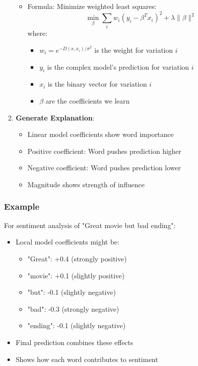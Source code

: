 \documentclass{article}
\begin{document}
\begin{enumerate}
\begin{itemize}
\begin{itemize}
                \end{itemize}
            \item Formula: Minimize weighted least squares:
                \begin{equation}
                    \min_{\beta} \sum_{i} w_i(y_i - \beta^T x_i)^2 + \lambda\|\beta\|^2
                \end{equation}
                where:
                \begin{itemize}
                    \item $w_i = e^{-D(x,x_i)/\sigma^2}$ is the weight for variation $i$
                    \item $y_i$ is the complex model's prediction for variation $i$
                    \item $x_i$ is the binary vector for variation $i$
                    \item $\beta$ are the coefficients we learn
                \end{itemize}
        \end{itemize}
    
    \item \textbf{Generate Explanation}:
        \begin{itemize}
            \item Linear model coefficients show word importance
            \item Positive coefficient: Word pushes prediction higher
            \item Negative coefficient: Word pushes prediction lower
            \item Magnitude shows strength of influence
        \end{itemize}
\end{enumerate}

\subsubsection{Example}
For sentiment analysis of "Great movie but bad ending":
\begin{itemize}
    \item Local model coefficients might be:
        \begin{itemize}
            \item "Great": +0.4 (strongly positive)
            \item "movie": +0.1 (slightly positive)
            \item "but": -0.1 (slightly negative)
            \item "bad": -0.3 (strongly negative)
            \item "ending": -0.1 (slightly negative)
        \end{itemize}
    \item Final prediction combines these effects
    \item Shows how each word contributes to sentiment
\end{itemize}
\end{document}
